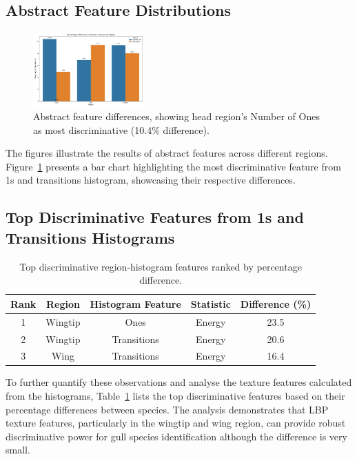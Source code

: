\documentclass[a4paper,12pt]{report}
\begin{document}
\subsection{Abstract Feature Distributions}
\begin{figure}[H]
    \centering
    \includegraphics[width=0.38\textwidth]{images/LBP/default_feature_diff_barchart.png}
    \caption{Abstract feature differences, showing head region's Number of Ones as most discriminative (10.4\% difference).}
    \label{fig:abstract_features}
\end{figure}

The figures illustrate the results of abstract features across different regions. Figure~\ref{fig:abstract_features} presents a bar chart highlighting the most discriminative feature from 1s and transitions histogram, showcasing their respective differences.

\subsection{Top Discriminative Features from 1s and Transitions Histograms}
\begin{table}[H]
    \centering
    \caption{Top discriminative region-histogram features ranked by percentage difference.}
    \label{tab:region_histogram_features}
    \begin{tabular}{c c c c c}
        \toprule
        \textbf{Rank} & \textbf{Region} & \textbf{Histogram Feature} & \textbf{Statistic} & \textbf{Difference (\%)} \\
        \midrule
        1 & Wingtip & Ones & Energy & 23.5 \\
        2 & Wingtip & Transitions & Energy & 20.6 \\
        3 & Wing & Transitions & Energy & 16.4 \\
        \bottomrule
    \end{tabular}   
    \label{tab:top_discriminative_features}
\end{table}

To further quantify these observations and analyse the texture features calculated from the histograms, Table~\ref{tab:top_discriminative_features} lists the top discriminative features based on their percentage differences between species. The analysis demonstrates that LBP texture features, particularly in the wingtip and wing region, can provide robust discriminative power for gull species identification although the difference is very small.
\end{document}

